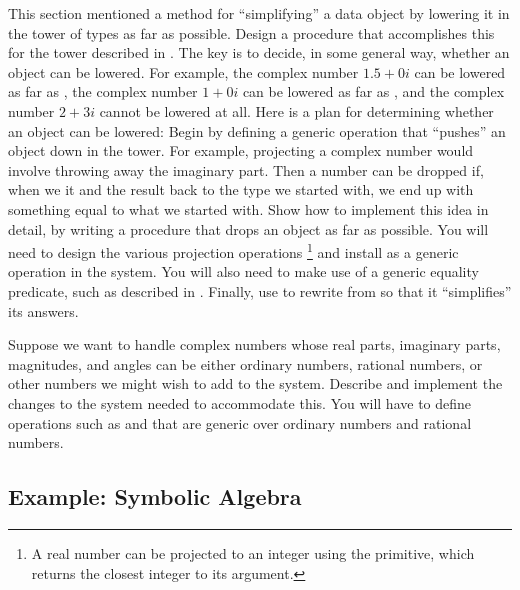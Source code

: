 \begin{exercise}
	\label{Exercise 2.85}
	This section mentioned a method for “simplifying” a data object by lowering it in the tower of types as far as possible.
	Design a procedure  that accomplishes this for the tower described in .
	The key is to decide, in some general way, whether an object can be lowered.
	For example, the complex number \( 1.5 + 0i \) can be lowered as far as , the complex number \( 1 + 0i \) can be lowered as far as , and the complex number \( 2 + 3i \) cannot be lowered at all.
	Here is a plan for determining whether an object can be lowered:
	Begin by defining a generic operation  that “pushes” an object down in the tower.
	For example, projecting a complex number would involve throwing away the imaginary part.
	Then a number can be dropped if, when we  it and  the result back to the type we started with, we end up with something equal to what we started with.
	Show how to implement this idea in detail, by writing a  procedure that drops an object as far as possible.
	You will need to design the various projection operations%
	\footnote{
		A real number can be projected to an integer using the  primitive, which returns the closest integer to its argument.
	}
	and install  as a generic operation in the system.
	You will also need to make use of a generic equality predicate, such as described in .
	Finally, use  to rewrite  from  so that it “simplifies” its answers.
\end{exercise}



\begin{exercise}
	\label{Exercise 2.86}
	Suppose we want to handle complex numbers whose real parts, imaginary parts, magnitudes, and angles can be either ordinary numbers, rational numbers, or other numbers we might wish to add to the system.
	Describe and implement the changes to the system needed to accommodate this.
	You will have to define operations such as  and  that are generic over ordinary numbers and rational numbers.
\end{exercise}



\subsection{Example: Symbolic Algebra}
\label{Section 2.5.3}

